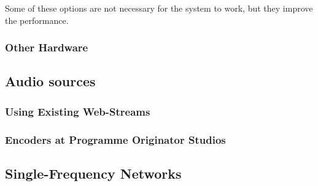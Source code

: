 Some of these options are not necessary for the system to work, but they improve the performance.

\subsubsection{Other Hardware}

\subsection{Audio sources}
\subsubsection{Using Existing Web-Streams}
\subsubsection{Encoders at Programme Originator Studios}

\subsection{Single-Frequency Networks}
